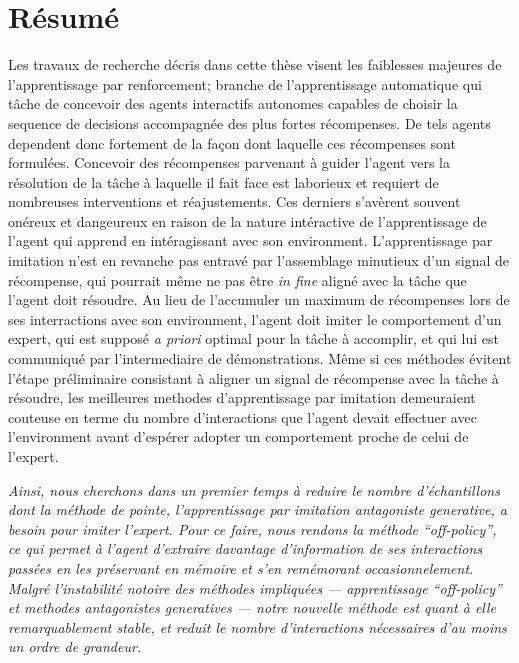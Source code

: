 

\thispagestyle{empty}
\chapter*{Résumé}

Les travaux de recherche décris dans cette thèse visent les faiblesses majeures
de l'apprentissage par renforcement; branche de l'apprentissage automatique
qui tâche de concevoir des agents interactifs autonomes capables de choisir la
sequence de decisions accompagnée des plus fortes récompenses.
De tels agents dependent donc fortement de la façon dont laquelle ces récompenses sont formulées.
Concevoir des récompenses parvenant à guider l'agent vers la résolution de la tâche à laquelle
il fait face est laborieux et requiert de nombreuses interventions et réajustements.
Ces derniers s'avèrent souvent onéreux et dangeureux en raison de la nature intéractive de
l'apprentissage de l'agent qui apprend en intéragissant avec son environment.
L'apprentissage par imitation n'est en revanche pas entravé par l'assemblage minutieux
d'un signal de récompense, qui pourrait même ne pas être \textit{in fine} aligné avec la
tâche que l'agent doit résoudre.
Au lieu de l'accumuler un maximum de récompenses lors de ses interractions avec son
environment, l'agent doit imiter le comportement d'un expert,
qui est supposé \textit{a priori} optimal pour la tâche à accomplir, et
qui lui est communiqué par l'intermediaire de démonstrations.
Même si ces méthodes évitent l'étape préliminaire consistant à aligner un signal
de récompense avec la tâche à résoudre, les meilleures methodes d'apprentissage
par imitation demeuraient couteuse en terme du nombre d'interactions que l'agent
devait effectuer avec l'environment avant d'espérer adopter un comportement proche
de celui de l'expert.

\emph{%
Ainsi, nous cherchons dans un premier temps
à reduire le nombre d'échantillons dont la méthode de pointe,
l'apprentissage par imitation antagoniste generative,
a besoin pour imiter l'expert.
Pour ce faire, nous rendons la méthode ``off-policy'',
ce qui permet à l'agent d'extraire davantage d'information de ses interactions passées
en les préservant en mémoire et s'en remémorant occasionnelement.
Malgré l'instabilité notoire des méthodes impliquées
--- apprentissage ``off-policy'' et methodes antagonistes generatives ---
notre nouvelle méthode est quant à elle remarquablement stable,
et reduit le nombre d'interactions nécessaires d'au moins un ordre de grandeur.
}

